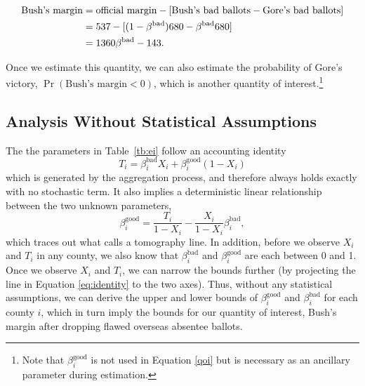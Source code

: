\documentclass[11pt,titlepage]{article}
\newcommand{\bb}{\beta^{\text{bad}}}
\newcommand{\bg}{\beta^{\text{good}}}
\newcommand{\vs}{\vspace{-\baselineskip}}
\begin{document}
\vs
{}\baselineskip
\begin{align}
  \text{Bush's margin} & = \text{official margin}
  - [\text{Bush's bad ballots} - \text{Gore's bad ballots}] \notag\\
  & = 537 - [(1-\bb)680-\bb 680]\notag\\
  & = 1360 \bb - 143. \label{qoi}
\end{align}

\vs
{}\baselineskip
\noindent Once we estimate this quantity, we can also estimate the probability
of Gore's victory, $\Pr(\text{Bush's margin}<0)$, which is another
quantity of interest.\footnote{Note that $\bg_i$ is not used in
  Equation \ref{qoi} but is necessary as an ancillary parameter during
  estimation.}

\subsection{Analysis Without Statistical Assumptions} \label{s:noassump}

The the parameters in Table~\ref{tb:ei} follow an accounting identity
\begin{equation} \label{eq:gid}
  T_i=\bb_i X_i+\bg_i (1-X_i)
\end{equation} 
which is generated by the aggregation process, and therefore always
holds exactly with no stochastic term. It also implies a deterministic
linear relationship between the two unknown parameters,
\begin{equation} \label{eq:identity}
\bg_i = \frac{T_i}{1-X_i}-\frac{X_i}{1-X_i}\bb_i,
\end{equation}
which traces out what \citet{king:97} calls a tomography line.  In
addition, before we observe $X_i$ and $T_i$ in any county, we also
know that $\bb_i$ and $\bg_i$ are each between 0 and 1.  Once we
observe $X_i$ and $T_i$, we can narrow the bounds further (by
projecting the line in Equation \ref{eq:identity} to the two axes).
Thus, without any statistical assumptions, we can derive the upper and
lower bounds of $\bg_i$ and $\bb_i$ for each county $i$, which in turn
imply the bounds for our quantity of interest, Bush's margin after
dropping flawed overseas absentee ballots.
\end{document}
